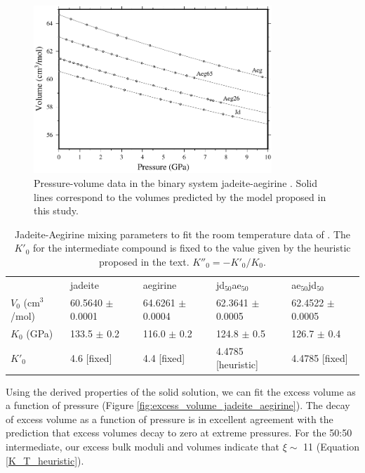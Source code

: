 \documentclass[review]{elsarticle}
\begin{document}
\begin{figure}[ht!]
  \centering
  \includegraphics[width=0.8\textwidth]{figures/jadeite_aegirine_P_V}
  \caption{Pressure-volume data in the binary system jadeite-aegirine \citep{NBLBT2006}. Solid lines correspond to the volumes predicted by the model proposed in this study.}
  \label{fig:PV_jadeite_aegirine}
\end{figure}

\begin{table}[ht!]
\centering
\caption{Jadeite-Aegirine mixing parameters to fit the room temperature data of \cite{NBLBT2006}. The $K'_0$ for the intermediate compound is fixed to the value given by the heuristic proposed in the text. $K''_0 = -K'_0/K_0$.}
\label{tab:jd_aeg}
\begin{tabular}{lllll}
                   & jadeite              & aegirine             & jd$_{50}$ae$_{50}$             & ae$_{50}$jd$_{50}$             \\
$V_0$ (cm$^3$/mol) & 60.5640 $\pm$ 0.0001 & 64.6261 $\pm$ 0.0004 & 62.3641 $\pm$ 0.0005 & 62.4522 $\pm$ 0.0005 \\
$K_0$ (GPa)        & 133.5 $\pm$ 0.2      & 116.0 $\pm$ 0.2      & 124.8 $\pm$ 0.5      & 126.7 $\pm$ 0.4      \\
$K'_0$             & 4.6 [fixed]                 & 4.4 [fixed]                 & 4.4785 [heuristic]              & 4.4785  [fixed]           
\end{tabular}
\end{table}

Using the derived properties of the solid solution, we can fit the excess volume as a function of pressure (Figure \ref{fig:excess_volume_jadeite_aegirine}). The decay of excess volume as a function of pressure is in excellent agreement with the prediction that excess volumes decay to zero at extreme pressures. For the 50:50 intermediate, our excess bulk moduli and volumes indicate that $\xi \sim$ 11 (Equation \ref{K_T_heuristic}).
\end{document}
